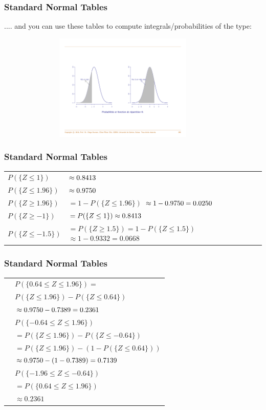 \documentclass[notes=show,smaller,handout]{beamer}
\begin{document}
\begin{frame}%
\frametitle{Standard Normal Tables}
.... and you can use these tables to compute integrals/probabilities of the type: 
\begin{figure}[ptb]\centering
\includegraphics[height=2in, width=4in]{CDF_pr.pdf}%
\end{figure}%
\end{frame}%

\begin{frame}%
\frametitle{Standard Normal Tables}

\begin{example}[Prob of $Z$]


\noindent
\begin{tabular}{ll}
$P(\{Z\leq 1\})$ & $\approx0.8413\bigskip $ \\
$P(\{Z\leq 1.96\})$ & $\approx0.9750\bigskip $ \\
$P(\{Z\geq 1.96\})$ & $=1-P(\{Z\leq 1.96\})$ $\approx1-0.9750=0.0250\bigskip $\\
$P(\{Z\geq -1\})$ & $=P(\{Z\leq 1\})\approx0.8413\bigskip $ \\ 
$P(\{Z\leq -1.5\})$ & $=P(\{Z\geq 1.5\}) =1-P(\{Z\leq 1.5\})$ $\approx1-0.9332=0.0668$%
\end{tabular}

\end{example}
\end{frame}%

\begin{frame}%
\frametitle{Standard Normal Tables}

\begin{example}[cont'd]

\begin{tabular}{ll}
& $P(\{0.64\leq Z\leq 1.96\})=$ \\ 
& $P(\{Z\leq 1.96\})-P(\{Z\leq 0.64\})$ \\ 
& $\approx 0.9750-0.7389=0.2361\bigskip $ \\ 
& $P(\{-0.64\leq Z\leq 1.96\})$ \\ 
& $=P(\{Z\leq 1.96\})-P(\{Z\leq -0.64\})$ \\
& $=P(\{Z\leq 1.96\})-(1-P(\{Z\leq 0.64\}))$ \\ 
& $\approx0.9750-(1-0.7389)=0.7139\bigskip $ \\ 
& $P(\{-1.96\leq Z\leq -0.64\})$ \\ 
& $=P(\{0.64\leq Z\leq 1.96\})$ \\ 
& $\approx0.2361$%
\end{tabular}
\end{example}
\end{frame}%
\end{document}
